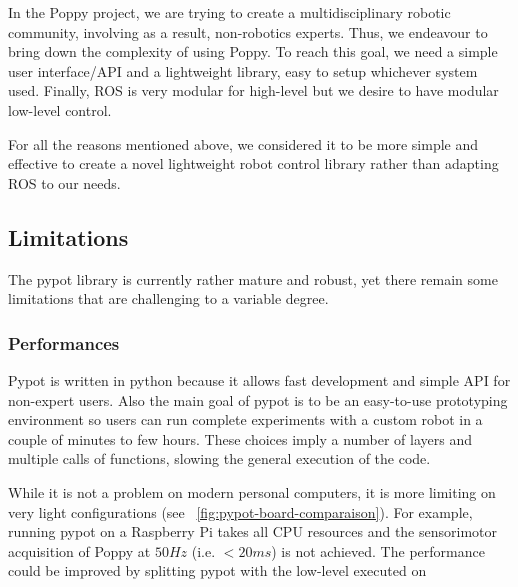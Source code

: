 In the Poppy project, we are trying to create a multidisciplinary robotic community, involving as a result, non-robotics experts. Thus, we endeavour to bring down the complexity of using Poppy. To reach this goal, we need a simple user interface/API and a lightweight library, easy to setup whichever system used. Finally, ROS is very modular for high-level but we desire to have modular low-level control.

For all the reasons mentioned above, we considered it to be more simple and effective to create a novel lightweight robot control library rather than adapting ROS to our needs.


\subsection{Limitations} %

The pypot library is currently rather mature and robust, yet there remain some limitations that are challenging to a variable degree.

\subsubsection{Performances}

Pypot is written in python because it allows fast development and simple API for non-expert users. Also the main goal of pypot is to be an easy-to-use prototyping environment so users can run complete experiments with a custom robot in a couple of minutes to few hours. These choices imply a number of layers and multiple calls of functions, slowing the general execution of the code.

While it is not a problem on modern personal computers, it is more limiting on very light configurations (see \figurename~\ref{fig:pypot-board-comparaison}). For example, running pypot on a Raspberry Pi takes all CPU resources and the sensorimotor acquisition of Poppy at $50Hz$ (i.e. $<20ms$) is not achieved.
The performance could be improved by splitting pypot with the low-level executed on


